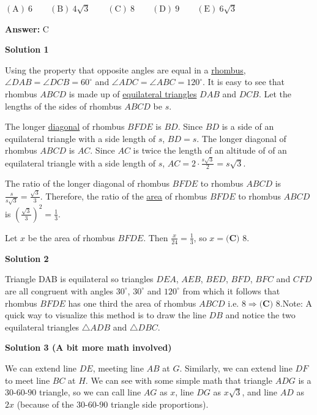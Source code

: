 \begin{enumerate}
$\mathrm{(A) \ } 6\qquad \mathrm{(B) \ } 4\sqrt{3}\qquad \mathrm{(C) \ } 8\qquad \mathrm{(D) \ } 9\qquad \mathrm{(E) \ } 6\sqrt{3}$

 \textbf{Answer: }C



\textbf{Solution 1}

Using the property that opposite angles are equal in a \href{https://artofproblemsolving.com/wiki/index.php?title=Rhombus}{rhombus}, $\angle DAB = \angle DCB = 60 ^\circ$ and $\angle ADC = \angle ABC = 120 ^\circ$. It is easy to see that rhombus $ABCD$ is made up of \href{https://artofproblemsolving.com/wiki/index.php?title=Equilateral\_triangle}{equilateral triangles} $DAB$ and $DCB$. Let the lengths of the sides of rhombus $ABCD$ be $s$. 

 The longer \href{https://artofproblemsolving.com/wiki/index.php?title=Diagonal}{diagonal} of rhombus $BFDE$ is $BD$. Since $BD$ is a side of an equilateral triangle with a side length of $s$, $BD = s$. The longer diagonal of rhombus $ABCD$ is $AC$. Since $AC$ is twice the length of an altitude of of an equilateral triangle with a side length of $s$, $AC = 2 \cdot \frac{s\sqrt{3}}{2} = s\sqrt{3}$.

 The ratio of the longer diagonal of rhombus $BFDE$ to rhombus $ABCD$ is $\frac{s}{s\sqrt{3}} = \frac{\sqrt{3}}{3}$. Therefore, the ratio of the \href{https://artofproblemsolving.com/wiki/index.php?title=Area}{area} of rhombus $BFDE$ to rhombus $ABCD$ is $\left( \frac{\sqrt{3}}{3} \right) ^2 = \frac{1}{3}$.

 Let $x$ be the area of rhombus $BFDE$. Then $\frac{x}{24} = \frac{1}{3}$, so $x = \boxed{\textbf{(C) }8}$.

 



\textbf{Solution 2}

Triangle DAB is equilateral so triangles $DEA$, $AEB$, $BED$, $BFD$, $BFC$ and $CFD$ are all congruent with angles $30^\circ$, $30^\circ$ and $120^\circ$ from which it follows that rhombus $BFDE$ has one third the area of rhombus $ABCD$ i.e. $8 \Longrightarrow \boxed{\textbf{(C) }8}$.Note: A quick way to visualize this method is to draw the line $DB$ and notice the two equilateral triangles $\triangle ADB$ and $\triangle DBC$.

 



\textbf{Solution 3 (A bit more math involved)}

We can extend line $DE$, meeting line $AB$ at $G$. Similarly, we can extend line $DF$ to meet line $BC$ at $H$. We can see with some simple math that triangle $ADG$ is a $30$-$60$-$90$ triangle, so we can call line $AG$ as $x$, line $DG$ as $x\sqrt{3}$, and line $AD$ as $2x$ (because of the $30$-$60$-$90$ triangle side proportions). 


\end{enumerate}
